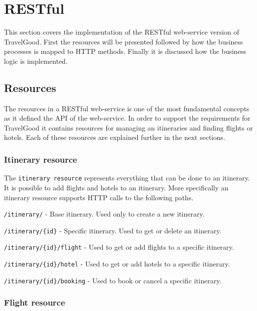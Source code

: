 \section{RESTful}
\pet

\noindent
This section covers the implementation of the RESTful web-service version of TravelGood. First the resources will be presented followed by how the business processes is mapped to HTTP methods. Finally it is discussed how the business logic is implemented.

\subsection{Resources}
\pet

\noindent
The resources in a RESTful web-service is one of the most fundamental concepts as it defined the API of the web-service. In order to support the requirements for TravelGood it contains resources for managing an itineraries and finding flights or hotels. Each of these resources are explained further in the next sections.

\subsubsection{Itinerary resource}
\kim

\noindent
The \texttt{itinerary resource} represents everything that can be done to an itinerary. It is possible to add flights and hotels to an itinerary. More specifically an itinerary resource supports HTTP calls to the following paths.
\begin{description}
	\item \texttt{/itinerary/} - Base itinerary. Used only to create a new itinerary.
	\item \texttt{/itinerary/\{id\}} - Specific itinerary. Used to get or delete an itinerary.
	\item \texttt{/itinerary/\{id\}/flight} - Used to get or add flights to a specific itinerary.
	\item \texttt{/itinerary/\{id\}/hotel} - Used to get or add hotels to a specific itinerary.
	\item \texttt{/itinerary/\{id\}/booking} - Used to book or cancel a specific itinerary.
\end{description}

\subsubsection{Flight resource}
\mrb

